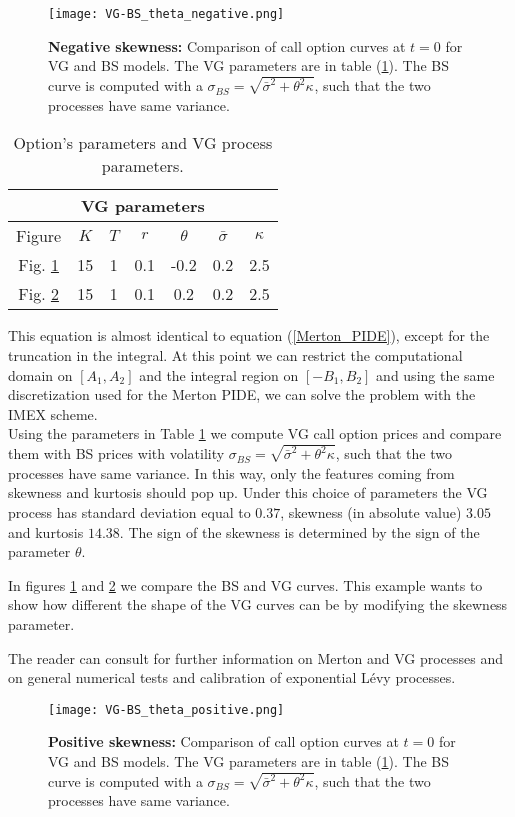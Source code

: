 \begin{figure}[!t]
   \centering
   \texttt{[image: VG-BS\_theta\_negative.png]}
   \caption{\textbf{Negative skewness:} Comparison of call option curves at $t=0$ for VG and BS models. The VG parameters are in table (\ref{tab:VG}). The BS curve is computed with a 
   $\sigma_{BS} = \sqrt{\bar\sigma^2 + \theta^2 \kappa}$, such that the two processes have same variance.}
   \label{BS_VG} 
 \end{figure}
\begin{table}[h]
  \centering
  \begin{tabular}{ccccccc}
  \toprule
  \multicolumn{7}{c}{VG parameters} \\
  \midrule
  Figure & $K$ & $T$ & $r$ & $\theta$ & $\bar\sigma$ &$\kappa$ \\
  \midrule
  Fig. \ref{BS_VG} & 15 & 1 & 0.1 & -0.2 & 0.2 & 2.5 \\
  Fig. \ref{BS_VG2} & 15 & 1 & 0.1 & 0.2 & 0.2 & 2.5 \\
  \bottomrule
  \end{tabular}
  \caption{Option's parameters and VG process parameters.}
  \label{tab:VG}
\end{table}

This equation is almost identical to equation (\ref{Merton_PIDE}), except for the truncation in the integral. 
At this point we can restrict the computational domain on $[A_1,A_2]$ and the integral region on $[-B_1,B_2]$ and using the same discretization
used for the Merton PIDE, we can solve the problem with the IMEX scheme.\\

Using the parameters in Table \ref{tab:VG} we compute VG call option prices and compare them with BS prices with volatility $\sigma_{BS} = \sqrt{\bar\sigma^2 + \theta^2 \kappa}$, 
such that the two processes have same variance.
In this way, only the features coming from skewness and kurtosis should pop up.
Under this choice of parameters the VG process has standard deviation equal to $0.37$, skewness (in absolute value) $3.05$ and kurtosis $14.38$.
The sign of the skewness is determined by the sign of the parameter $\theta$.

In figures \ref{BS_VG} and \ref{BS_VG2} we compare the BS and VG curves.
This example wants to show how different the shape of the VG curves can be by modifying the skewness parameter.

The reader can consult \cite{Schoutens} for further information on Merton and VG processes and on general numerical tests and calibration of exponential Lévy processes. 
\begin{figure}[!t]
   \centering
   \texttt{[image: VG-BS\_theta\_positive.png]}
   \caption{\textbf{Positive skewness:} Comparison of call option curves at $t=0$ for VG and BS models. The VG parameters are in table (\ref{tab:VG}). The BS curve is computed with a 
   $\sigma_{BS} = \sqrt{\bar\sigma^2 + \theta^2 \kappa}$, such that the two processes have same variance.}
   \label{BS_VG2} 
\end{figure}



